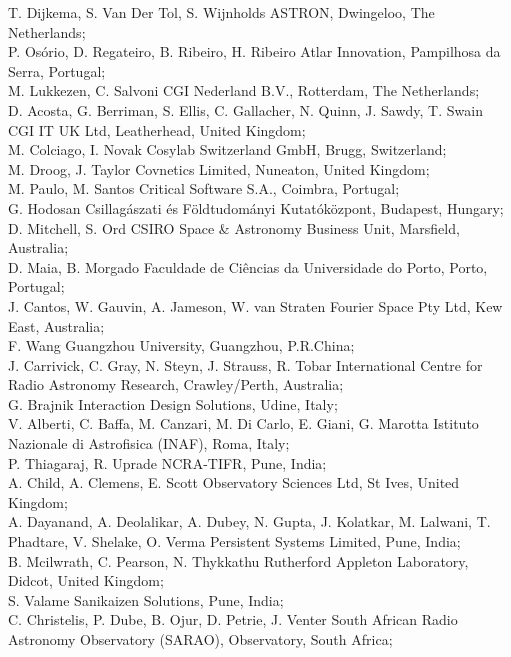 \documentclass[a4paper,
               biblatex,     %
               keeplastbox,   %
               ]{jacow}
\begin{document}
T. Dijkema,
S. Van Der Tol,
S. Wijnholds ASTRON, Dwingeloo, The Netherlands;\\
P. Osório,
D. Regateiro,
B. Ribeiro,
H. Ribeiro Atlar Innovation, Pampilhosa da Serra, Portugal;\\
M. Lukkezen,
C. Salvoni CGI Nederland B.V., Rotterdam, The Netherlands;\\
D. Acosta,
G. Berriman,
S. Ellis,
C. Gallacher,
N. Quinn,
J. Sawdy,
T. Swain CGI IT UK Ltd, Leatherhead, United Kingdom;\\
M. Colciago,
I. Novak Cosylab Switzerland GmbH, Brugg, Switzerland;\\
M. Droog,
J. Taylor Covnetics Limited, Nuneaton, United Kingdom;\\
M. Paulo,
M. Santos Critical Software S.A., Coimbra, Portugal;\\
G. Hodosan Csillagászati és Földtudományi Kutatóközpont, Budapest, Hungary;\\
D. Mitchell,
S. Ord CSIRO Space \& Astronomy Business Unit, Marsfield, Australia;\\
D. Maia,
B. Morgado Faculdade de Ciências da Universidade do Porto, Porto, Portugal;\\
J. Cantos,
W. Gauvin,
A. Jameson,
W. van Straten Fourier Space Pty Ltd, Kew East, Australia;\\
F. Wang Guangzhou University, Guangzhou, P.R.China;\\
J. Carrivick,
C. Gray,
N. Steyn,
J. Strauss,
R. Tobar International Centre for Radio Astronomy Research, Crawley/Perth, Australia;\\
G. Brajnik Interaction Design Solutions, Udine, Italy;\\
V. Alberti,
C. Baffa,
M. Canzari,
M. Di Carlo,
E. Giani,
G. Marotta Istituto Nazionale di Astrofisica (INAF), Roma, Italy;\\
P. Thiagaraj,
R. Uprade NCRA-TIFR, Pune, India;\\
A. Child,
A. Clemens,
E. Scott Observatory Sciences Ltd, St Ives, United Kingdom;\\
A. Dayanand,
A. Deolalikar,
A. Dubey,
N. Gupta,
J. Kolatkar,
M. Lalwani,
T. Phadtare,
V. Shelake,
O. Verma Persistent Systems Limited, Pune, India;\\
B. Mcilwrath,
C. Pearson,
N. Thykkathu Rutherford Appleton Laboratory, Didcot, United Kingdom;\\
S. Valame Sanikaizen Solutions, Pune, India;\\
C. Christelis,
P. Dube,
B. Ojur,
D. Petrie,
J. Venter South African Radio Astronomy Observatory (SARAO), Observatory, South Africa;\\
\end{document}
